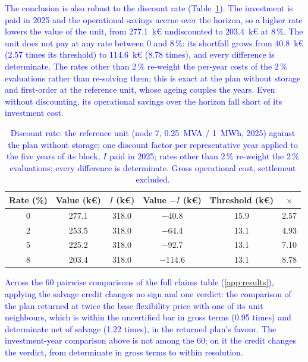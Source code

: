 \documentclass[preprint,12pt]{elsarticle}
\begin{document}
\textcolor{blue}{
    The conclusion is also robust to the discount rate (Table~\ref{tab:res_discount}). The investment is paid in 2025 and the operational savings accrue over the horizon, so a higher rate lowers the value of the unit, from 277.1~k\euro{} undiscounted to 203.4~k\euro{} at 8\,\%. The unit does not pay at any rate between 0 and 8\,\%: its shortfall grows from 40.8~k\euro{} (2.57 times its threshold) to 114.6~k\euro{} (8.78 times), and every difference is determinate. 
    The rates other than 2\,\% re-weight the per-year costs of the 2\,\% evaluations rather than re-solving them; this is exact at the plan without storage and first-order at the reference unit, whose ageing couples the years.
    Even without discounting, its operational savings over the horizon fall short of its investment cost.
}

\begin{table}[htbp!]
    \centering
    \caption{\textcolor{blue}{Discount rate: the reference unit (node 7, 0.25~MVA / 1~MWh, 2025) against the plan without storage; one discount factor per representative year applied to the five years of its block, $I$ paid in 2025; rates other than 2\,\% re-weight the 2\,\% evaluations; every difference is determinate. Gross operational cost, settlement excluded.}}
    \label{tab:res_discount}
    \scriptsize\setlength{\tabcolsep}{5pt}
    \begin{tabular}{c c c c c c}
        \toprule
        Rate (\%) & Value (k\euro) & $I$ (k\euro) & Value $- I$ (k\euro) & Threshold (k\euro) & $\times$ \\
        \midrule
        0 & 277.1 & 318.0 & $-$40.8  & 15.9 & 2.57 \\
        2 & 253.5 & 318.0 & $-$64.4  & 13.1 & 4.93 \\
        5 & 225.2 & 318.0 & $-$92.7  & 13.1 & 7.10 \\
        8 & 203.4 & 318.0 & $-$114.6 & 13.1 & 8.78 \\
        \bottomrule
    \end{tabular}
\end{table}

\textcolor{blue}{
    Across the 60 pairwise comparisons of the full claims table (\ref{app:results}), applying the salvage credit changes no sign and one verdict: the comparison of the plan returned at twice the base flexibility price with one of its unit neighbours, which is within the uncertified bar in gross terms (0.95 times) and determinate net of salvage (1.22 times), in the returned plan's favour. The investment-year comparison above is not among the 60; on it the credit changes the verdict, from determinate in gross terms to within resolution.
}
\end{document}
